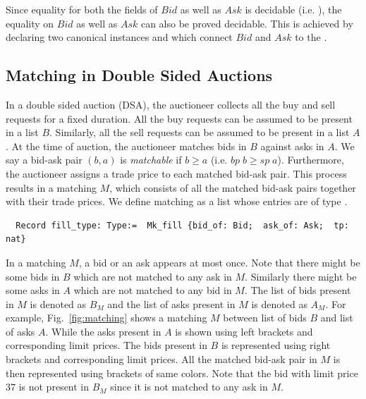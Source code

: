 \documentclass[a4paper,UKenglish,cleveref, autoref]{lipics-v2019}
\begin{document}
Since equality for both the fields of $Bid$ as well as $Ask$ is decidable (i.e. ), the equality on $Bid$ as well as $Ask$ can also be proved decidable. This is achieved by declaring two canonical instances  and  which connect $Bid$ and $Ask$ to the .  

\subsection{Matching in Double Sided Auctions}
In a double sided auction (DSA), the auctioneer collects all the buy and sell requests for a fixed duration. All the buy requests can be assumed to be present in a list $B$. Similarly, all the sell requests can be assumed to be present in a list $A$. At the time of auction, the auctioneer matches bids in $B$ against asks in $A$. We say a bid-ask pair $(b, a)$ is \emph{matchable} if $b \ge a$ (i.e. $bp \; b \ge sp \; a$).  Furthermore, the auctioneer assigns a trade price to each matched bid-ask pair. This  process results in  a matching $M$, which consists of all the matched bid-ask pairs together with their trade prices. We define matching as a list whose entries are of type .
\begin{verbatim}
  Record fill_type: Type:=  Mk_fill {bid_of: Bid;  ask_of: Ask;  tp: nat} 
\end{verbatim}

In a matching $M$, a bid or an ask appears at most once. Note that there might be some bids in $B$ which are not matched to any ask in $M$. Similarly there might be some asks in $A$ which are not matched to any bid in $M$. The list of bids present in $M$ is denoted as $B_{M}$ and the list of asks present in $M$ is denoted as $A_M$. For example, Fig.~\ref{fig:matching} shows a matching $M$ between list of bids $B$ and list of asks $A$.  While the asks present in $A$ is shown using left brackets and corresponding limit prices. The bids present in $B$ is represented using right brackets and corresponding limit prices.  All the matched bid-ask pair in $M$ is then represented using  brackets of same colors. Note that the bid with limit price $37$ is not present in $B_M$ since it is not matched to any ask in $M$.  
\end{document}

